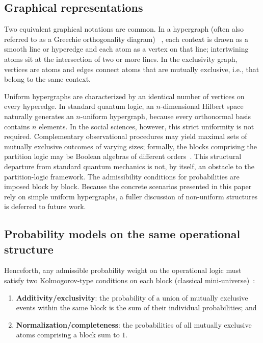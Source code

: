 \documentclass{article}
\begin{document}
\subsection{Graphical representations}
\label{sec:prelim-gr}

Two equivalent graphical notations are common. In a hypergraph
(often also referred to as a Greechie orthogonality diagram)
~\cite{greechie:71,Bretto-MR3077516}, each context is drawn as a
smooth line or hyperedge and each atom as a vertex on that line;
intertwining atoms sit at the intersection of two or more lines. In
the exclusivity graph, vertices are atoms and edges connect atoms
that are mutually exclusive, i.e., that belong to the same context.

Uniform hypergraphs are characterized by an identical number of
vertices on every hyperedge. In standard quantum logic, an
$n$-dimensional Hilbert space naturally generates an $n$-uniform
hypergraph, because every orthonormal basis contains $n$ elements.
In the social sciences, however, this strict uniformity is not
required. Complementary observational procedures may yield maximal
sets of mutually exclusive outcomes of varying sizes; formally, the
blocks comprising the partition logic may be Boolean algebras of
different orders~\cite{greechie:71}. This structural departure from
standard quantum mechanics is not, by itself, an obstacle to the
partition-logic framework. The admissibility conditions for
probabilities are imposed block by block. Because the concrete
scenarios presented in this paper rely on simple uniform
hypergraphs, a fuller discussion of non-uniform structures is
deferred to future work.

\subsection{Probability models on the same operational structure}
\label{sec:twoprob}

Henceforth, any admissible probability weight on the operational
logic must satisfy two Kolmogorov-type conditions on each block
(classical mini-universe)~\cite{Gleason}:
\begin{enumerate}
\item \textbf{Additivity/exclusivity}: the probability of a union
of mutually exclusive events within the same block is the sum of
their individual probabilities; and
\item \textbf{Normalization/completeness}: the probabilities of all
mutually exclusive atoms comprising a block sum to $1$.
\end{enumerate}
\end{document}
